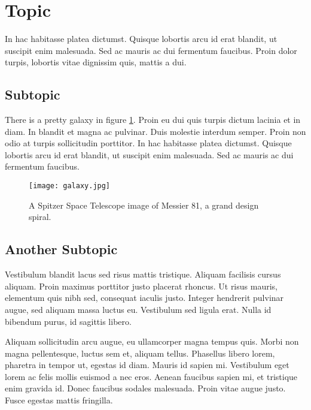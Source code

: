 \documentclass{stsci_report}
\begin{document}
\section*{Topic}

In hac habitasse platea dictumst. Quisque lobortis arcu id erat blandit, ut suscipit enim malesuada. Sed ac mauris ac dui fermentum faucibus. Proin dolor turpis, lobortis vitae dignissim quis, mattis a dui.

\subsection*{Subtopic}

There is a pretty galaxy in figure \ref{fig:galaxy}. Proin eu dui quis turpis dictum lacinia et in diam. In blandit et magna ac pulvinar. Duis molestie interdum semper. Proin non odio at turpis sollicitudin porttitor. In hac habitasse platea dictumst. Quisque lobortis arcu id erat blandit, ut suscipit enim malesuada. Sed ac mauris ac dui fermentum faucibus.

\begin{figure}[h]
  \centering
  \texttt{[image: galaxy.jpg]}
    \caption{A Spitzer Space Telescope image of Messier 81, a grand design spiral.}
    \label{fig:galaxy}
\end{figure}

\subsection*{Another Subtopic}

Vestibulum blandit lacus sed risus mattis tristique. Aliquam facilisis cursus aliquam. Proin maximus porttitor justo placerat rhoncus. Ut risus mauris, elementum quis nibh sed, consequat iaculis justo. Integer hendrerit pulvinar augue, sed aliquam massa luctus eu. Vestibulum sed ligula erat. Nulla id bibendum purus, id sagittis libero.

Aliquam sollicitudin arcu augue, eu ullamcorper magna tempus quis. Morbi non magna pellentesque, luctus sem et, aliquam tellus. Phasellus libero lorem, pharetra in tempor ut, egestas id diam. Mauris id sapien mi. Vestibulum eget lorem ac felis mollis euismod a nec eros. Aenean faucibus sapien mi, et tristique enim gravida id. Donec faucibus sodales malesuada. Proin vitae augue justo. Fusce egestas mattis fringilla.

\printbibliography
\end{document}
